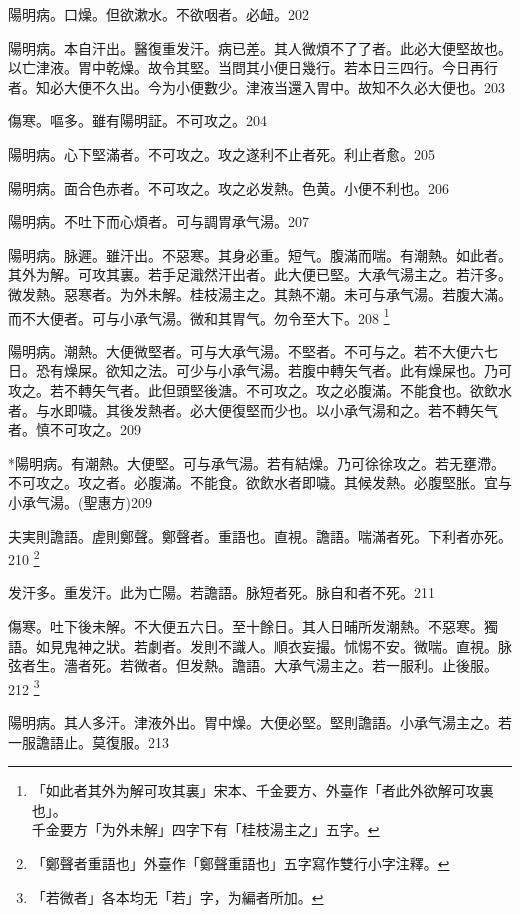 \documentclass[b5paper,twoside,zihao=-4,UTF8]{ctexbook}
\begin{document}
陽明病。口燥。但欲漱水。不欲咽者。必衄。202

陽明病。本自汗出。醫復重发汗。病已差。其人微煩不了了者。此必大便堅故也。以亡津液。胃中乾燥。故令其堅。当問其小便日幾行。若本日三四行。今日再行者。知必大便不久出。今为小便數少。津液当還入胃中。故知不久必大便也。203

傷寒。嘔多。雖有陽明証。不可攻之。204

陽明病。心下堅滿者。不可攻之。攻之遂利不止者死。利止者愈。205

陽明病。面合色赤者。不可攻之。{攻之}必发熱。色黄。小便不利也。206

陽明病。不吐下而{心}煩者。可与{調胃}承气湯。207

陽明病。脉遲。雖汗出。不惡寒。其身必重。短气。腹滿而喘。有潮熱。如此者。其外为解。可攻其裏。若手足濈然汗出者。此大便已堅。{大}承气湯主之。若汗多。微发熱。惡寒者。为外未解。{桂枝湯主之。}其熱不潮。未可与承气湯。若腹大滿。而不大便者。可与小承气湯。微和其胃气。勿令至大下。208
	\footnote{「如此者其外为解可攻其裏」宋本、千金要方、外臺作「者此外欲解可攻裏也」。\\千金要方「为外未解」四字下有「桂枝湯主之」五字。}

陽明病。潮熱。大便微堅者。可与{大}承气湯。不堅者。不可与之。若不大便六七日。恐有燥屎。欲知之法。可少与小承气湯。若腹中轉矢气者。此有燥屎也。乃可攻之。若不轉矢气者。此但頭堅後溏。不可攻之。攻之必腹滿。不能食也。欲飲水者。与水即噦。其後发熱者。必大便復堅而少也。以小承气湯和之。若不轉矢气者。慎不可攻之。209

*陽明病。有潮熱。大便堅。可与承气湯。若有結燥。乃可徐徐攻之。若无壅滯。不可攻之。攻之者。必腹滿。不能食。欲飲水者即噦。其候发熱。必腹堅胀。宜与小承气湯。(聖惠方)209

夫実則譫語。虗則鄭聲。鄭聲者。重語也。直視。譫語。喘滿者死。下利者亦死。210
	\footnote{「鄭聲者重語也」外臺作「鄭聲重語也」五字寫作雙行小字注釋。}

发汗多。重发汗。{此为}亡陽。{若}譫語。脉短者死。脉自和者不死。211

傷寒。吐下後未解。不大便五六日。至十餘日。其人日晡所发潮熱。不惡寒。獨語。如見鬼{神之}狀。若劇者。发則不識人。順衣妄撮。怵惕不安。微喘。直視。脉弦者生。濇者死。{若}微者。但发熱。譫語。{大}承气湯主之。若一服利。止後服。212
	\footnote{「若微者」各本均无「若」字，为編者所加。}

陽明病。其人多汗。津液外出。胃中燥。大便必堅。堅則譫語。{小}承气湯主之。{若一服譫語止。莫復服。}213
\end{document}
